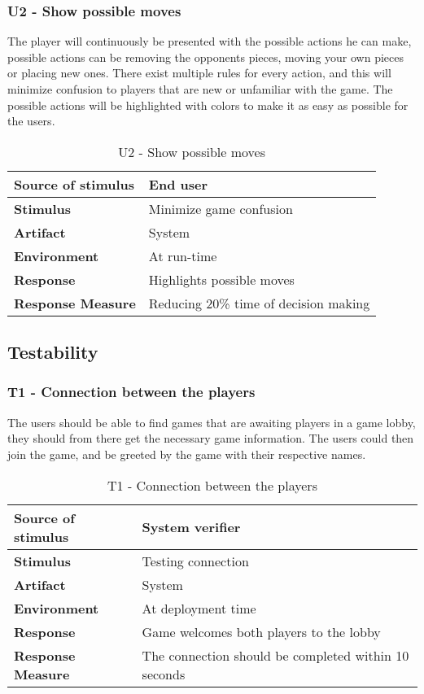 \pagebreak

\subsubsection{U2 - Show possible moves}

The player will continuously be presented with the possible actions he can make, possible actions can be removing the opponents pieces, moving your own pieces or placing new ones. There exist multiple rules for every action, and this will minimize confusion to players that are new or unfamiliar with the game. The possible actions will be highlighted with colors to make it as easy as possible for the users.

\begin{table}[h!]
\begin{tabular}{ | p{110pt} | p{250pt}  |}
\hline
\bf Source of stimulus &  End user  \\ \hline
\bf Stimulus & Minimize game confusion \\ \hline 
\bf Artifact & System  \\  \hline
\bf Environment & At run-time \\ \hline
\bf Response & Highlights possible moves \\ \hline
\bf Response Measure & Reducing 20\% time of decision making   \\ \hline

\end{tabular}
\caption{U2 - Show possible moves}
\end{table}

\subsection{Testability}

\subsubsection{T1 - Connection between the players}
The users should be able to find games that are awaiting players in a game lobby, they should from there get the necessary game information. The users could then join the game, and be greeted by the game with their respective names. 

\begin{table}[h!]
\begin{tabular}{ | p{110pt} | p{250pt}  |}
\hline
\bf Source of stimulus & System verifier  \\ \hline
\bf Stimulus & Testing connection \\ \hline 
\bf Artifact & System  \\  \hline
\bf Environment & At deployment time \\ \hline
\bf Response & Game welcomes both players to the lobby \\ \hline
\bf Response Measure & The connection should be completed within 10 seconds \\ \hline

\end{tabular}
\caption{T1 - Connection between the players}
\end{table}

\pagebreak




